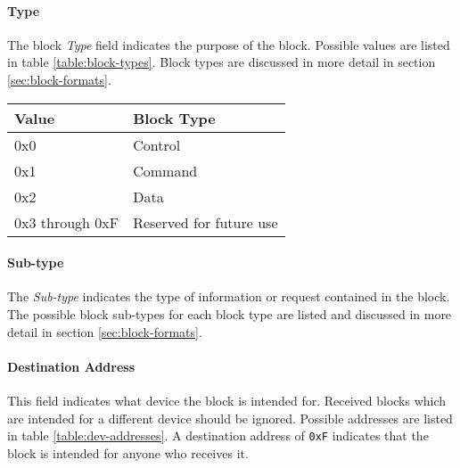 \paragraph{Type}
The block \emph{Type} field indicates the purpose of the block. Possible values are listed in table
\ref{table:block-types}. Block types are discussed in more detail in section \ref{sec:block-formats}.

\begin{table*}
    \centering
    \begin{tabular}{@{}ll@{}}
        \toprule
        Value           & Block Type              \\
        \midrule
        0x0             & Control                 \\
        0x1             & Command                 \\
        0x2             & Data                    \\
        0x3 through 0xF & Reserved for future use \\
        \bottomrule
    \end{tabular}
    \caption{Block types}
    \label{table:block-types}
\end{table*}

\paragraph{Sub-type}
The \emph{Sub-type} indicates the type of information or request contained in the block. The possible block sub-types
for each block type are listed and discussed in more detail in section \ref{sec:block-formats}.

\paragraph{Destination Address}
This field indicates what device the block is intended for. Received blocks which are intended for a different device
should be ignored. Possible addresses are listed in table \ref{table:dev-addresses}. A destination address of
\lstinline{0xF} indicates that the block is intended for anyone who receives it.
